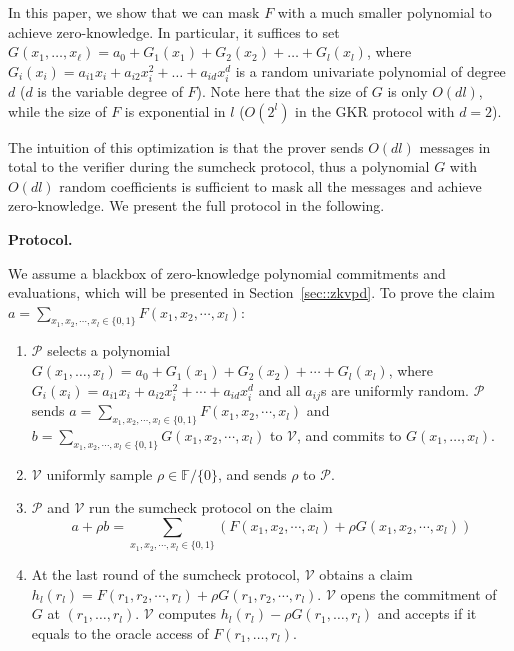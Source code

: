 In this paper, we show that we can mask $F$ with a much smaller polynomial to achieve zero-knowledge. In particular, it suffices to set $G(x_1, \ldots, x_\ell) = a_{0} + G_1(x_1) + G_2(x_2) + \ldots + G_l(x_l)$, where $G_{i}(x_i) = a_{i1}x_i + a_{i2}x_i^2 + \ldots + a_{id}x_i^d$ is a random univariate polynomial of degree $d$ ($d$ is the variable degree of $F$). Note here that the size of $G$ is only $O(dl)$, while the size of $F$ is exponential in $l$ ($O(2^l)$ in the GKR protocol with $d=2$).

The intuition of this optimization is that the prover sends $O(dl)$ messages in total to the verifier during the sumcheck protocol, thus a polynomial $G$ with $O(dl)$ random coefficients is sufficient to mask all the messages and achieve zero-knowledge. We present the full protocol in the following.


\medskip\noindent\textbf{Protocol.}

We assume a blackbox of zero-knowledge polynomial commitments and evaluations, which will be presented in Section~\ref{sec::zkvpd}. To prove the claim $a = \sum\limits_{x_1, x_2, \cdots, x_l \in \{0, 1\}} F(x_1, x_2, \cdots, x_l)$:
\begin{enumerate}

\item $\mathcal{P}$ selects a polynomial $G(x_1,\ldots, x_l) = a_{0} + G_1(x_1) + G_2(x_2) + \cdots + G_l(x_l)$, where $G_{i}(x_i) = a_{i1}x_i + a_{i2}x_i^2 + \cdots + a_{id}x_i^d$ and all $a_{ij}$s are uniformly random. $\mathcal{P}$ sends $a = \sum\limits_{x_1, x_2, \cdots, x_l \in \{0, 1\}} F(x_1, x_2, \cdots, x_l)$ and $b = \sum\limits_{x_1, x_2, \cdots, x_l \in \{0, 1\}} G(x_1, x_2, \cdots, x_l)$ to $\mathcal{V}$, and commits to $G(x_1,\ldots, x_l)$. 
\item $\mathcal{V}$ uniformly sample $\rho \in \mathbb{F}/\{0\}$, and sends $\rho$ to $\mathcal{P}$.
\item $\mathcal{P}$ and $\mathcal{V}$ run the sumcheck protocol on the claim
$$a + \rho b = \sum\limits_{x_1, x_2, \cdots, x_l \in \{0, 1\}}(F(x_1, x_2, \cdots, x_l) + \rho G(x_1, x_2, \cdots, x_l))$$
\item At the last round of the sumcheck protocol, $\mathcal{V}$ obtains a claim $h_l(r_l) = F(r_1, r_2, \cdots, r_l)+\rho G(r_1, r_2, \cdots, r_l)$. $\mathcal{V}$ opens the commitment of $G$ at $(r_1,\ldots, r_l)$. $\mathcal{V}$ computes $h_l(r_l)-\rho G(r_1,\ldots,r_l)$ and accepts if it equals to the oracle access of $F(r_1,\ldots, r_l)$.

\end{enumerate}

